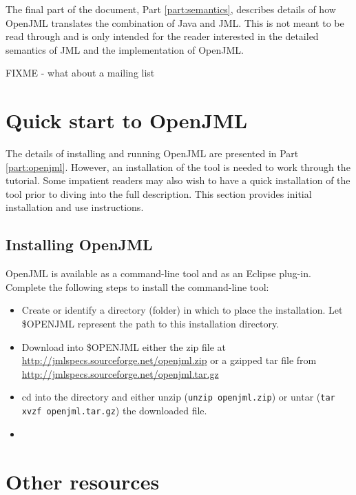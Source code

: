 The final part of the document, Part \ref{part:semantics}, describes details of how OpenJML translates the combination of Java and JML. This is not meant to be read through and is only intended for the reader interested in the detailed semantics of JML and the implementation of OpenJML.

FIXME - what about a mailing list

\chapter{Quick start to OpenJML}

The details of installing and running OpenJML are presented in Part \ref{part:openjml}. However, an installation of the tool is needed to work through the tutorial. Some impatient readers may also wish to have a quick installation of the tool prior to diving into the full description. This section provides initial installation and use instructions.

\section{Installing OpenJML}

OpenJML is available as a command-line tool and as an Eclipse plug-in. Complete the following steps to install the command-line tool:
\begin{itemize}
\item Create or identify a directory (folder) in which to place the installation. Let \$OPENJML represent the path to this installation directory.
\item Download into \$OPENJML either the zip file at \url{http://jmlspecs.sourceforge.net/openjml.zip} or a gzipped tar file from \url{http://jmlspecs.sourceforge.net/openjml.tar.gz}
\item cd into the directory and either unzip (\texttt{unzip openjml.zip}) or untar (\texttt{tar xvzf openjml.tar.gz}) the downloaded file.
\item
\end{itemize}

\chapter{Other resources}

